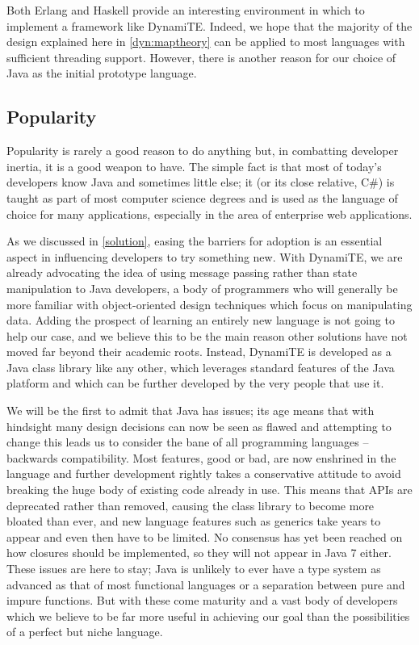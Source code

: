 Both Erlang and Haskell provide an interesting environment in which to
implement a framework like DynamiTE.  Indeed, we hope that the
majority of the design explained here in \ref{dyn:maptheory} can be
applied to most languages with sufficient threading support.  However,
there is another reason for our choice of Java as the initial
prototype language.

\subsection{Popularity}

Popularity is rarely a good reason to do anything but, in combatting
developer inertia, it is a good weapon to have.  The simple fact is
that most of today's developers know Java and sometimes little else;
it (or its close relative, C\#) is taught as part of most computer
science degrees and is used as the language of choice for many
applications, especially in the area of enterprise web applications.

As we discussed in \ref{solution}, easing the barriers for adoption is
an essential aspect in influencing developers to try something new.
With DynamiTE, we are already advocating the idea of using message
passing rather than state manipulation to Java developers, a body of
programmers who will generally be more familiar with object-oriented
design techniques which focus on manipulating data.  Adding the
prospect of learning an entirely new language is not going to help our
case, and we believe this to be the main reason other solutions have
not moved far beyond their academic roots.  Instead, DynamiTE is
developed as a Java class library like any other, which leverages
standard features of the Java platform and which can be further
developed by the very people that use it.

We will be the first to admit that Java has issues; its age means that
with hindsight many design decisions can now be seen as flawed and
attempting to change this leads us to consider the bane of all
programming languages -- backwards compatibility.  Most features, good
or bad, are now enshrined in the language and further development
rightly takes a conservative attitude to avoid breaking the huge body
of existing code already in use.  This means that APIs are deprecated
rather than removed, causing the class library to become more bloated
than ever, and new language features such as generics take years to
appear and even then have to be limited.  No consensus has yet been
reached on how closures should be implemented, so they will not appear
in Java 7 either.  These issues are here to stay; Java is unlikely to
ever have a type system as advanced as that of most functional
languages or a separation between pure and impure functions.  But with
these come maturity and a vast body of developers which we believe to
be far more useful in achieving our goal than the possibilities of a
perfect but niche language.

